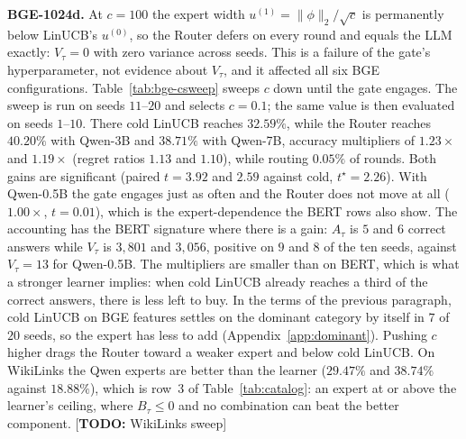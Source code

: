 \documentclass{article}
\theoremstyle{definition}
\theoremstyle{remark}
\theoremstyle{remark}
\newcommand{\todo}[1]{\textcolor{red!70!black}{[\textbf{TODO:} #1]}}
\begin{document}
\textbf{BGE-1024d.} At $c=100$ the expert width $u^{(1)}=\|\phi\|_2/\sqrt c$
is permanently below LinUCB's $u^{(0)}$, so the Router defers on every round
and equals the LLM exactly: $V_\tau=0$ with zero variance across seeds. This
is a failure of the gate's hyperparameter, not evidence about $V_\tau$, and it
affected all six BGE configurations. Table~\ref{tab:bge-csweep} sweeps $c$
down until the gate engages. The sweep is run on seeds $11$--$20$ and selects
$c=0.1$; the same value is then evaluated on seeds $1$--$10$. There cold LinUCB
reaches $32.59\%$, while the Router reaches $40.20\%$ with Qwen-3B and
$38.71\%$ with Qwen-7B, accuracy multipliers of $1.23\times$ and $1.19\times$
(regret ratios $1.13$ and $1.10$), while routing $0.05\%$ of rounds. Both gains
are significant (paired $t=3.92$ and $2.59$ against cold, $t^\star=2.26$). With
Qwen-0.5B the gate engages just as often and the Router does not move at all
($1.00\times$, $t=0.01$), which is the expert-dependence the BERT rows also
show. The accounting has the BERT signature where there is a gain: $A_\tau$ is
$5$ and $6$ correct answers while $V_\tau$ is $3{,}801$ and $3{,}056$, positive
on $9$ and $8$ of the ten seeds, against $V_\tau=13$ for Qwen-0.5B. The
multipliers are smaller than on BERT, which is what a stronger learner implies:
when cold LinUCB already reaches a third of the correct answers, there is less
left to buy. In the terms of the previous paragraph, cold LinUCB on BGE
features settles on the dominant category by itself in $7$ of $20$ seeds, so
the expert has less to add (Appendix~\ref{app:dominant}). Pushing $c$ higher
drags the Router toward a weaker expert and below cold LinUCB. On WikiLinks
the Qwen experts are better than the learner ($29.47\%$ and $38.74\%$ against
$18.88\%$), which is row~3 of Table~\ref{tab:catalog}: an expert at or above the
learner's ceiling, where $B_\tau\le0$ and no combination can beat the better
component. \todo{WikiLinks sweep}
\end{document}
